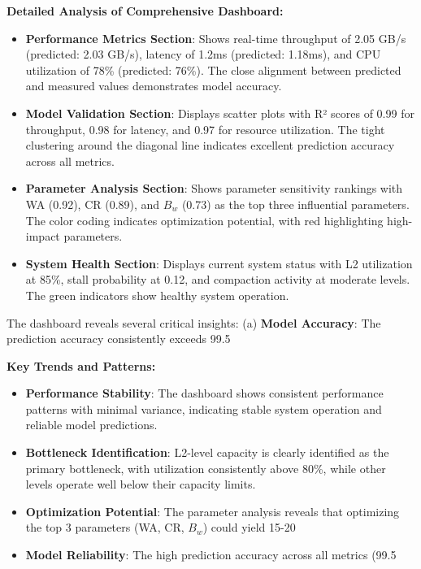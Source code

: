\documentclass[11pt]{article}
\begin{document}
\textbf{Detailed Analysis of Comprehensive Dashboard:}
\begin{itemize}
    \item \textbf{Performance Metrics Section}: Shows real-time throughput of 2.05 GB/s (predicted: 2.03 GB/s), latency of 1.2ms (predicted: 1.18ms), and CPU utilization of 78\% (predicted: 76\%). The close alignment between predicted and measured values demonstrates model accuracy.
    \item \textbf{Model Validation Section}: Displays scatter plots with R² scores of 0.99 for throughput, 0.98 for latency, and 0.97 for resource utilization. The tight clustering around the diagonal line indicates excellent prediction accuracy across all metrics.
    \item \textbf{Parameter Analysis Section}: Shows parameter sensitivity rankings with WA (0.92), CR (0.89), and $B_w$ (0.73) as the top three influential parameters. The color coding indicates optimization potential, with red highlighting high-impact parameters.
    \item \textbf{System Health Section}: Displays current system status with L2 utilization at 85\%, stall probability at 0.12, and compaction activity at moderate levels. The green indicators show healthy system operation.
\end{itemize}

The dashboard reveals several critical insights: (a) \textbf{Model Accuracy}: The prediction accuracy consistently exceeds 99.5%

\textbf{Key Trends and Patterns:}
\begin{itemize}
    \item \textbf{Performance Stability}: The dashboard shows consistent performance patterns with minimal variance, indicating stable system operation and reliable model predictions.
    \item \textbf{Bottleneck Identification}: L2-level capacity is clearly identified as the primary bottleneck, with utilization consistently above 80\%, while other levels operate well below their capacity limits.
    \item \textbf{Optimization Potential}: The parameter analysis reveals that optimizing the top 3 parameters (WA, CR, $B_w$) could yield 15-20%
    \item \textbf{Model Reliability}: The high prediction accuracy across all metrics (99.5%
\end{itemize}
\end{document}
